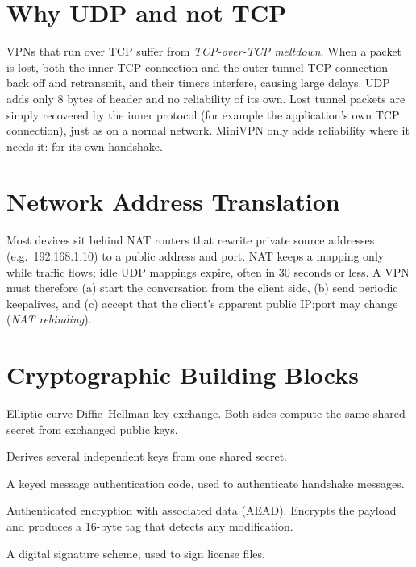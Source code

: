 \documentclass[12pt,a4paper]{report}
\begin{document}
\section{Why UDP and not TCP}
VPNs that run over TCP suffer from \emph{TCP-over-TCP meltdown}. When a packet is lost,
both the inner TCP connection and the outer tunnel TCP connection back off and
retransmit, and their timers interfere, causing large delays. UDP adds only 8 bytes of
header and no reliability of its own. Lost tunnel packets are simply recovered by the
inner protocol (for example the application's own TCP connection), just as on a normal
network. MiniVPN only adds reliability where it needs it: for its own handshake.

\section{Network Address Translation}
Most devices sit behind NAT routers that rewrite private source addresses
(e.g.\ 192.168.1.10) to a public address and port. NAT keeps a mapping only while
traffic flows; idle UDP mappings expire, often in 30 seconds or less. A VPN must
therefore (a) start the conversation from the client side, (b) send periodic
keepalives, and (c) accept that the client's apparent public IP:port may change
(\emph{NAT rebinding}).

\section{Cryptographic Building Blocks}
\begin{description}[style=nextline]
  \item[X25519 (RFC 7748)] Elliptic-curve Diffie--Hellman key exchange. Both sides compute the same shared secret from exchanged public keys.
  \item[HKDF-SHA256 (RFC 5869)] Derives several independent keys from one shared secret.
  \item[HMAC-SHA256 (RFC 2104)] A keyed message authentication code, used to authenticate handshake messages.
  \item[ChaCha20-Poly1305 (RFC 8439)] Authenticated encryption with associated data (AEAD). Encrypts the payload and produces a 16-byte tag that detects any modification.
  \item[Ed25519 (RFC 8032)] A digital signature scheme, used to sign license files.
\end{description}
\end{document}
